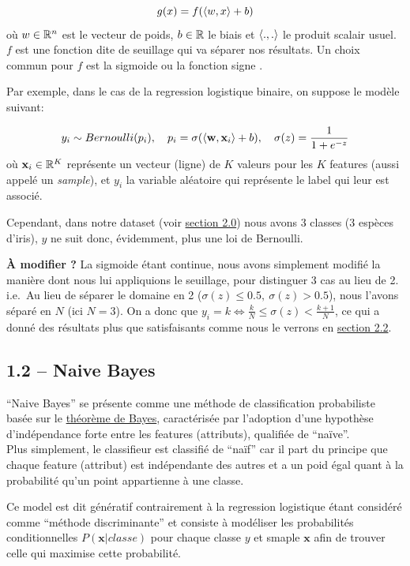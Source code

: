\documentclass[
]{article}
\begin{document}
\[
g(x) = f(\langle w, x \rangle + b)
\] où \(w \in \mathbb{R}^n\) est le vecteur de poids, \(b \in \mathbb{R}\) le biais et
\(\langle ., . \rangle\) le produit scalair usuel. \(f\) est une fonction
dite de seuillage qui va séparer nos résultats. Un choix commun pour
\(f\) est la sigmoide ou la fonction signe
\cite{ClassifieurLineaire2022}.

Par exemple, dans le cas de la regression logistique binaire, on suppose
le modèle suivant:

\[
y_i \sim Bernoulli(p_i),\quad p_i = \sigma(\langle \mathbf{w}, \mathbf{x}_i \rangle + b),\quad \sigma(z) = \frac{1}{1 + e^{-z}}
\] où \(\mathbf{x}_i \in \mathbb{R}^K\) représente un vecteur (ligne) de \(K\)
valeurs pour les \(K\) features (aussi appelé un \emph{sample}), et
\(y_i\) la variable aléatoire qui représente le label qui leur est
associé.

Cependant, dans notre dataset (voir
\href{#choix-du-dataset-outils-utilisuxe9s}{section 2.0}) nous avons 3
classes (3 espèces d'iris), \(y\) ne suit donc, évidemment, plus une loi
de Bernoulli.

\textbf{À modifier ?} La sigmoide étant continue, nous avons simplement
modifié la manière dont nous lui appliquions le seuillage, pour
distinguer 3 cas au lieu de 2. i.e.~Au lieu de séparer le domaine en 2
(\(\sigma(z) \leq 0.5,\ \sigma(z) > 0.5\)), nous l'avons séparé en \(N\)
(ici \(N = 3\)). On a donc que
\(y_i = k \Leftrightarrow \frac{k}{N} \leq \sigma(z) < \frac{k + 1}{N}\),
ce qui a donné des résultats plus que satisfaisants comme nous le
verrons en \href{#ruxe9gression-logistique-1}{section 2.2}.

\hypertarget{naive-bayes}{%
\subsection{1.2 -- Naive Bayes}\label{naive-bayes}}

``Naive Bayes'' se présente comme une méthode de classification
probabiliste basée sur le
\href{https://en.wikipedia.org/wiki/Bayes\%27_theorem}{théorème de
Bayes}, caractérisée par l'adoption d'une hypothèse d'indépendance forte
entre les features (attributs), qualifiée de ``naïve''.\\
Plus simplement, le classifieur est classifié de ``naïf'' car il part du
principe que chaque feature (attribut) est indépendante des autres et a
un poid égal quant à la probabilité qu'un point appartienne à une
classe.

Ce model est dit génératif contrairement à la regression logistique
étant considéré comme ``méthode discriminante''
\cite{ClassifieurLineaire2022} et consiste à modéliser les probabilités
conditionnelles \(P(\mathbf{x}| classe)\) pour chaque classe \(y\) et
smaple \(\mathbf{x}\) afin de trouver celle qui maximise cette
probabilité.
\end{document}
